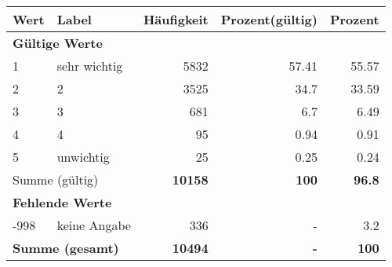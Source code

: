      \begin{longtable}{lXrrr}
     \toprule
     \textbf{Wert} & \textbf{Label} & \textbf{Häufigkeit} & \textbf{Prozent(gültig)} & \textbf{Prozent} \\
     \endhead
     \midrule
     \multicolumn{5}{l}{\textbf{Gültige Werte}}\\

     1 &
     \multicolumn{1}{X}{ sehr wichtig   } &


       \num{5832} &
       \num[round-mode=places,round-precision=2]{57.41} &
         \num[round-mode=places,round-precision=2]{55.57} \\

     2 &
     \multicolumn{1}{X}{ 2   } &


       \num{3525} &
       \num[round-mode=places,round-precision=2]{34.7} &
         \num[round-mode=places,round-precision=2]{33.59} \\

     3 &
     \multicolumn{1}{X}{ 3   } &


       \num{681} &
       \num[round-mode=places,round-precision=2]{6.7} &
         \num[round-mode=places,round-precision=2]{6.49} \\

     4 &
     \multicolumn{1}{X}{ 4   } &


       \num{95} &
       \num[round-mode=places,round-precision=2]{0.94} &
         \num[round-mode=places,round-precision=2]{0.91} \\

     5 &
     \multicolumn{1}{X}{ unwichtig   } &


       \num{25} &
       \num[round-mode=places,round-precision=2]{0.25} &
         \num[round-mode=places,round-precision=2]{0.24} \\
     \midrule
     \multicolumn{2}{l}{Summe (gültig)} &
       \textbf{\num{10158}} &
     \textbf{\num{100}} &
       \textbf{\num[round-mode=places,round-precision=2]{96.8}} \\
     \multicolumn{5}{l}{\textbf{Fehlende Werte}}\\
       -998 &
       keine Angabe &
         \num{336} &
        - &
         \num[round-mode=places,round-precision=2]{3.2} \\
     \midrule
     \multicolumn{2}{l}{\textbf{Summe (gesamt)}} &
          \textbf{\num{10494}} &
        \textbf{-} &
        \textbf{\num{100}} \\
     \bottomrule
     \end{longtable}
     
